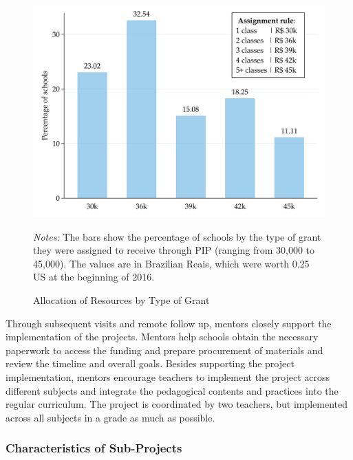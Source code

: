 \documentclass[11pt,a4paper]{article}
\begin{document}
\begin{figure}[ht!]
    \caption{Allocation of Resources by Type of Grant}
    \label{fig:grant}
    \centering
    
    \includegraphics[width=13cm]{DataWork/Output/Figures/fig3-grant.png}
    
    \begin{minipage}{0.8\textwidth}
        \small{\textit{Notes:} The bars show the percentage of schools by the type of grant they were assigned to receive through PIP (ranging from 30,000 to 45,000). The values are in Brazilian Reais, which were worth 0.25 US at the beginning of 2016.}
    \end{minipage}
    
\end{figure}
%

Through subsequent visits and remote follow up, mentors closely support the implementation of the projects. Mentors help schools obtain the necessary paperwork to access the funding and prepare procurement of materials and review the timeline and overall goals. Besides supporting the project implementation, mentors encourage teachers to implement the project across different subjects and integrate the pedagogical contents and practices into the regular curriculum. The project is coordinated by two teachers, but implemented across all subjects in a grade as much as possible. 

\subsubsection*{Characteristics of Sub-Projects} \label{sec:subprojects}
\end{document}
